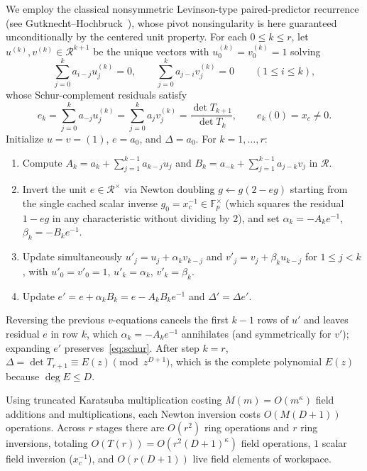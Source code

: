 \documentclass[11pt,reqno]{amsart}
\numberwithin{equation}{section}
\theoremstyle{definition}
\theoremstyle{remark}
\newcommand{\F}{\mathbb{F}}
\begin{document}
We employ the classical nonsymmetric Levinson-type paired-predictor recurrence (see Gutknecht--Hochbruck~\cite[Section~2, Algorithm~1]{GH95}), whose pivot nonsingularity is here guaranteed unconditionally by the centered unit property. For each $0\le k\le r$, let $u^{(k)}, v^{(k)}\in\mathcal{R}^{k+1}$ be the unique vectors with $u_0^{(k)} = v_0^{(k)} = 1$ solving
\[
\sum_{j=0}^k a_{i-j} u_j^{(k)} = 0,\qquad
\sum_{j=0}^k a_{j-i} v_j^{(k)} = 0\qquad (1\le i\le k),
\]
whose Schur-complement residuals satisfy
\begin{equation}
\label{eq:schur}
e_k = \sum_{j=0}^k a_{-j} u_j^{(k)} = \sum_{j=0}^k a_j v_j^{(k)} = \frac{\det T_{k+1}}{\det T_k},\qquad e_k(0) = x_c\neq 0.
\end{equation}
Initialize $u = v = (1)$, $e = a_0$, and $\Delta = a_0$. For $k = 1,\ldots,r$:
\begin{enumerate}[label=(\arabic*),leftmargin=2em]
\item Compute $A_k = a_k + \sum_{j=1}^{k-1} a_{k-j} u_j$ and $B_k = a_{-k} + \sum_{j=1}^{k-1} a_{j-k} v_j$ in $\mathcal{R}$.
\item Invert the unit $e\in\mathcal{R}^\times$ via Newton doubling $g \leftarrow g(2 - eg)$ starting from the single cached scalar inverse $g_0 = x_c^{-1}\in\F_p^\times$ (which squares the residual $1 - eg$ in any characteristic without dividing by $2$), and set $\alpha_k = -A_k e^{-1}$, $\beta_k = -B_k e^{-1}$.
\item Update simultaneously $u'_j = u_j + \alpha_k v_{k-j}$ and $v'_j = v_j + \beta_k u_{k-j}$ for $1\le j<k$, with $u'_0 = v'_0 = 1$, $u'_k = \alpha_k$, $v'_k = \beta_k$.
\item Update $e' = e + \alpha_k B_k = e - A_k B_k e^{-1}$ and $\Delta' = \Delta e'$.
\end{enumerate}
Reversing the previous $v$-equations cancels the first $k-1$ rows of $u'$ and leaves residual $e$ in row $k$, which $\alpha_k = -A_k e^{-1}$ annihilates (and symmetrically for $v'$); expanding $e'$ preserves~\eqref{eq:schur}. After step $k=r$, $\Delta = \det T_{r+1} \equiv E(z)\pmod{z^{D+1}}$, which is the complete polynomial $E(z)$ because $\deg E\le D$.

Using truncated Karatsuba multiplication costing $M(m) = O(m^\kappa)$ field additions and multiplications, each Newton inversion costs $O(M(D+1))$ operations. Across $r$ stages there are $O(r^2)$ ring operations and $r$ ring inversions, totaling $O(T(r)) = O(r^2(D+1)^\kappa)$ field operations, $1$ scalar field inversion ($x_c^{-1}$), and $O(r(D+1))$ live field elements of workspace.
\end{document}
